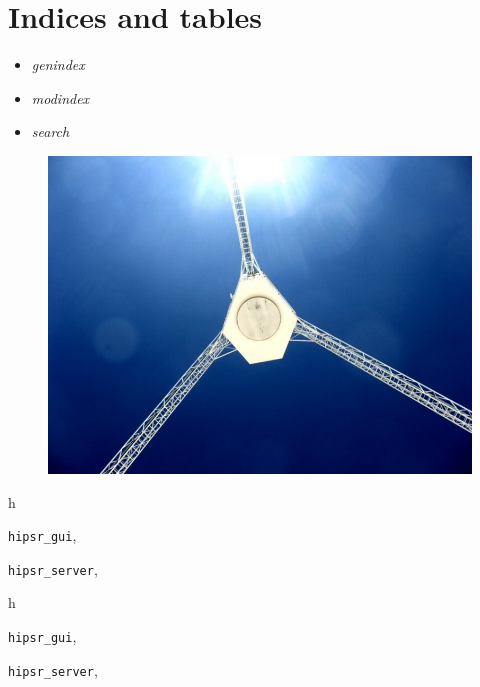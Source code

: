 \documentclass[letterpaper,10pt,english]{sphinxmanual}
\begin{document}
\chapter{Indices and tables}
\label{index:indices-and-tables}\begin{itemize}
\item {} 
\emph{genindex}

\item {} 
\emph{modindex}

\item {} 
\emph{search}

\end{itemize}
\begin{figure}[htbp]
\centering

\includegraphics{parkes_focus.jpg}
\end{figure}


\renewcommand{\indexname}{Python Module Index}
\begin{theindex}
\def\bigletter#1{{\Large\sffamily#1}\nopagebreak\vspace{1mm}}
\bigletter{h}
\item {\texttt{hipsr\_gui}}, \pageref{software:module-hipsr_gui}
\item {\texttt{hipsr\_server}}, \pageref{software:module-hipsr_server}
\end{theindex}
\renewcommand{\indexname}{Python Module Index}
\begin{theindex}
\def\bigletter#1{{\Large\sffamily#1}\nopagebreak\vspace{1mm}}
\bigletter{h}
\item {\texttt{hipsr\_gui}}, \pageref{software:module-hipsr_gui}
\item {\texttt{hipsr\_server}}, \pageref{software:module-hipsr_server}
\end{theindex}

\renewcommand{\indexname}{Index}
\printindex
\end{document}
